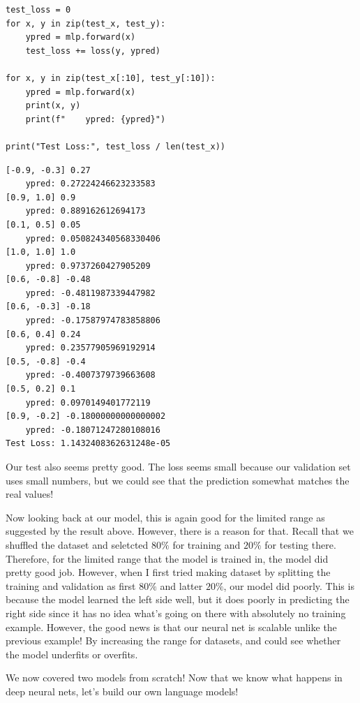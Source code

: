 \documentclass[../../../main.tex]{subfiles}
\begin{document}
\begin{jupyter}
\begin{lstlisting}[style=jin]
test_loss = 0
for x, y in zip(test_x, test_y):
    ypred = mlp.forward(x)
    test_loss += loss(y, ypred)

for x, y in zip(test_x[:10], test_y[:10]):
    ypred = mlp.forward(x)
    print(x, y)
    print(f"    ypred: {ypred}")

print("Test Loss:", test_loss / len(test_x))
\end{lstlisting}
\begin{lstlisting}[style=jout]
[-0.9, -0.3] 0.27
    ypred: 0.27224246623233583
[0.9, 1.0] 0.9
    ypred: 0.889162612694173
[0.1, 0.5] 0.05
    ypred: 0.050824340568330406
[1.0, 1.0] 1.0
    ypred: 0.9737260427905209
[0.6, -0.8] -0.48
    ypred: -0.4811987339447982
[0.6, -0.3] -0.18
    ypred: -0.17587974783858806
[0.6, 0.4] 0.24
    ypred: 0.23577905969192914
[0.5, -0.8] -0.4
    ypred: -0.4007379739663608
[0.5, 0.2] 0.1
    ypred: 0.0970149401772119
[0.9, -0.2] -0.18000000000000002
    ypred: -0.18071247280108016
Test Loss: 1.1432408362631248e-05
\end{lstlisting}
\end{jupyter}

Our test also seems pretty good. The loss seems small because our
validation set uses small numbers, but we could see that the
prediction somewhat matches the real values!

Now looking back at our model, this is again good for the limited
range as suggested by the result above. However, there is a reason
for that. Recall that we shuffled the dataset and seletcted $80\%$
for training and $20\%$ for testing there. Therefore, for the limited
range that the model is trained in, the model did pretty good job.
However, when I first tried making dataset by splitting the training
and validation as first $80\%$ and latter $20\%$, our model did
poorly. This is because the model learned the left side well, but
it does poorly in predicting the right side since it has no idea
what's going on there with absolutely no training example. However,
the good news is that our neural net is scalable unlike the previous
example! By increasing the range for datasets, and could see whether
the model underfits or overfits.

We now covered two models from scratch! Now that we know what
happens in deep neural nets, let's build our own language models!
\end{document}
